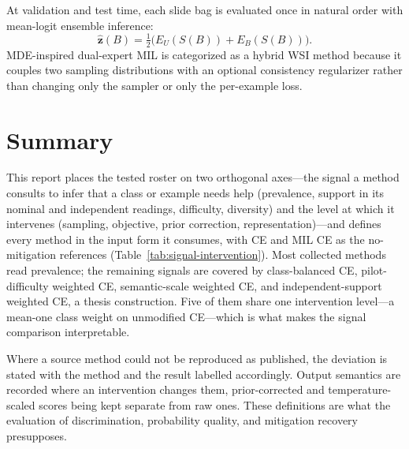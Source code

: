 \documentclass[11pt]{article}
\begin{document}
At validation and test time, each slide bag is evaluated once in natural order with mean-logit ensemble inference:
\begin{equation}
  \hat{\mathbf{z}}(B) = \tfrac{1}{2}\bigl(E_U(S(B)) + E_B(S(B))\bigr).
  \label{eq:mde-ensemble}
\end{equation}
\noindent MDE-inspired dual-expert MIL is categorized as a hybrid WSI method because it couples two sampling distributions with an optional consistency regularizer rather than changing only the sampler or only the per-example loss.

\section{Summary}
\label{sec:summary}
This report places the tested roster on two orthogonal axes---the signal a method consults to infer that a class or example needs help (prevalence, support in its nominal and independent readings, difficulty, diversity) and the level at which it intervenes (sampling, objective, prior correction, representation)---and defines every method in the input form it consumes, with CE and MIL CE as the no-mitigation references (Table~\ref{tab:signal-intervention}). Most collected methods read prevalence; the remaining signals are covered by class-balanced CE, pilot-difficulty weighted CE, semantic-scale weighted CE, and independent-support weighted CE, a thesis construction. Five of them share one intervention level---a mean-one class weight on unmodified CE---which is what makes the signal comparison interpretable.

Where a source method could not be reproduced as published, the deviation is stated with the method and the result labelled accordingly. Output semantics are recorded where an intervention changes them, prior-corrected and temperature-scaled scores being kept separate from raw ones. These definitions are what the evaluation of discrimination, probability quality, and mitigation recovery presupposes.

\clearpage


\end{document}

